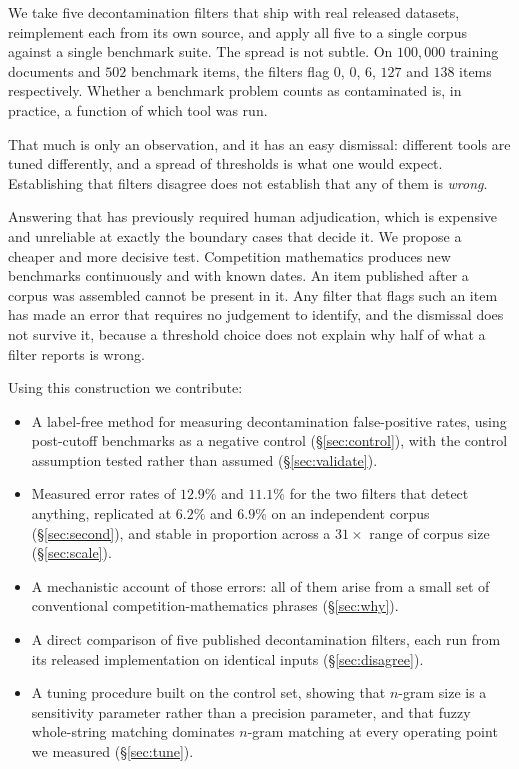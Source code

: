 \documentclass[11pt]{article}
\begin{document}
We take five decontamination filters that ship with real released datasets,
reimplement each from its own source, and apply all five to a single corpus
against a single benchmark suite. The spread is not subtle. On $100{,}000$
training documents and $502$ benchmark items, the filters flag $0$, $0$, $6$,
$127$ and $138$ items respectively. Whether a benchmark problem counts as
contaminated is, in practice, a function of which tool was run.

That much is only an observation, and it has an easy dismissal: different tools
are tuned differently, and a spread of thresholds is what one would expect.
Establishing that filters disagree does not establish that any of them is
\emph{wrong}.

Answering that has previously required human adjudication, which is expensive and
unreliable at exactly the boundary cases that decide it. We propose a cheaper and
more decisive test. Competition mathematics produces new benchmarks continuously
and with known dates. An item published after a corpus was assembled cannot be
present in it. Any filter that flags such an item has made an error that requires
no judgement to identify, and the dismissal does not survive it, because a
threshold choice does not explain why half of what a filter reports is wrong.

Using this construction we contribute:

\begin{itemize}
\item A label-free method for measuring decontamination false-positive rates,
using post-cutoff benchmarks as a negative control (\S\ref{sec:control}), with the
control assumption tested rather than assumed (\S\ref{sec:validate}).
\item Measured error rates of $12.9\%$ and $11.1\%$ for the two filters that
detect anything, replicated at $6.2\%$ and $6.9\%$ on an independent corpus
(\S\ref{sec:second}), and stable in proportion across a $31\times$ range of corpus
size (\S\ref{sec:scale}).
\item A mechanistic account of those errors: all of them arise from a small set of
conventional competition-mathematics phrases (\S\ref{sec:why}).
\item A direct comparison of five published decontamination filters, each run from
its released implementation on identical inputs (\S\ref{sec:disagree}).
\item A tuning procedure built on the control set, showing that $n$-gram size is a
sensitivity parameter rather than a precision parameter, and that fuzzy
whole-string matching dominates $n$-gram matching at every operating point we
measured (\S\ref{sec:tune}).
\end{itemize}
\end{document}
